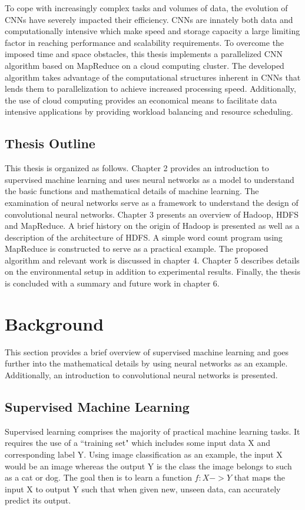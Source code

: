 \documentclass[12pt]{report}
\begin{document}
To cope with increasingly complex tasks and volumes of data, the evolution of CNNs have severely impacted their efficiency.  CNNs are innately both data and computationally intensive which make speed and storage capacity a large limiting factor in reaching performance and scalability requirements. To overcome the imposed time and space obstacles, this thesis implements a parallelized CNN algorithm based on MapReduce \cite{MR} on a cloud computing cluster. The developed algorithm takes advantage of the computational structures inherent in CNNs that lends them to parallelization to achieve increased processing speed. Additionally, the use of cloud computing provides an economical means to facilitate data intensive applications by providing workload balancing and resource scheduling.


\section{Thesis Outline}
This thesis is organized as follows.
Chapter 2 provides an introduction to supervised machine learning and uses neural networks as a model to understand the basic functions and mathematical details of machine learning. The examination of neural networks serve as a framework to understand the design of convolutional neural networks. Chapter 3 presents an overview of Hadoop, HDFS and MapReduce. A brief history on the origin of Hadoop is presented as well as a description of the architecture of HDFS. A simple word count program using MapReduce is constructed to serve as a practical example. The proposed algorithm and relevant work is discussed in chapter 4. Chapter 5 describes details on the environmental setup in addition to experimental results. Finally, the thesis is concluded with a summary and future work in chapter 6.


\chapter{Background}
This section provides a brief overview of supervised machine learning and goes further into the mathematical details by using neural networks as an example. Additionally, an introduction to convolutional neural networks is presented.

\section{Supervised Machine Learning}
Supervised learning comprises the majority of practical machine learning tasks.  It requires the use of a ``training set" which includes some input data X and corresponding label Y. Using image classification as an example, the input X would be an image whereas the output Y is the class the image belongs to such as a cat or dog.  The goal then is to learn a function $f: X -> Y$ that maps the input X to output Y such that when given new, unseen data, can accurately predict its output. 
\end{document}
